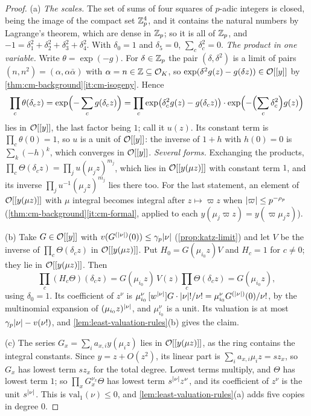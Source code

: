 \begin{proof}
(a) \emph{The scales.} The set of sums of four squares of $p$-adic integers is closed, being the image of the compact set $\mathbb{Z}_p^4$, and it contains the natural numbers by Lagrange's theorem, which are dense in $\mathbb{Z}_p$; so it is all of $\mathbb{Z}_p$, and $-1=\delta_1^2+\delta_2^2+\delta_3^2+\delta_4^2$. With $\delta_0=1$ and $\delta_5=0$, $\sum_c\delta_c^2=0$. \emph{The product in one variable.} Write $\theta=\exp(-g)$. For $\delta\in\mathbb{Z}_p$ the pair $(\delta,\delta^2)$ is a limit of pairs $(n,n^2)=(\alpha,\alpha\bar\alpha)$ with $\alpha=n\in\mathbb{Z}\subseteq\mathcal{O}_K$, so $\exp(\delta^2g(z)-g(\delta z))\in\mathcal{O}[[y]]$ by
\cref{thm:cm-background}\ref{it:cm-isogeny}. Hence
\[
  \prod_c\theta(\delta_cz)=\exp\Bigl(-\sum_cg(\delta_cz)\Bigr)=\prod_c\exp\bigl(\delta_c^2g(z)-g(\delta_cz)\bigr)\cdot\exp\Bigl(-\Bigl(\sum_c\delta_c^2\Bigr)g(z)\Bigr)
\]
lies in $\mathcal{O}[[y]]$, the last factor being $1$; call it $u(z)$. Its constant term is $\prod_c\theta(0)=1$, so $u$ is a unit of $\mathcal{O}[[y]]$: the inverse of $1+h$ with $h(0)=0$ is $\sum_k(-h)^k$, which converges in $\mathcal{O}[[y]]$. \emph{Several forms.} Exchanging the products, $\prod_c\Theta(\delta_cz)=\prod_ju(\mu_jz)^{m_j}$, which lies in $\mathcal{O}[[y(\mu z)]]$ with constant term $1$, and its inverse $\prod_ju^{-1}(\mu_jz)^{m_j}$ lies there too. For the last statement, an element of $\mathcal{O}[[y(\mu z)]]$ with $\mu$ integral becomes integral after $z\mapsto\varpi z$ when $\lvert \varpi\rvert\le p^{-\rho_p}$ (\cref{thm:cm-background}\ref{it:cm-formal}, applied to each $y(\mu_j\varpi z)=y(\varpi\mu_jz)$).

(b) Take $G\in\mathcal{O}[[y]]$ with $v(G^{(\lvert \nu\rvert)}(0))\le\gamma_p\lvert \nu\rvert$ (\cref{prop:katz-limit}) and let $V$ be the inverse of $\prod_c\Theta(\delta_cz)$ in $\mathcal{O}[[y(\mu z)]]$. Put $H_0=G(\mu_{i_0}z)V$ and $H_c=1$ for $c\ne0$; they lie in $\mathcal{O}[[y(\mu z)]]$. Then
\[
  \prod_c(H_c\Theta)(\delta_cz)=G(\mu_{i_0}z)\,V(z)\prod_c\Theta(\delta_cz)=G(\mu_{i_0}z),
\]
using $\delta_0=1$. Its coefficient of $z^\nu$ is $\mu_{i_0}^\nu\,[w^{\lvert \nu\rvert}]G\cdot\lvert \nu\rvert!/\nu!=\mu_{i_0}^\nu G^{(\lvert \nu\rvert)}(0)/\nu!$, by the multinomial expansion of $(\mu_{i_0}z)^{\lvert \nu\rvert}$, and $\mu_{i_0}^\nu$ is a unit. Its valuation is at most $\gamma_p\lvert \nu\rvert-v(\nu!)$, and \cref{lem:least-valuation-rules}(b) gives the claim.

(c) The series $G_x=\sum_ia_{x,i}y(\mu_iz)$ lies in $\mathcal{O}[[y(\mu z)]]$, as the ring contains the integral constants. Since $y=z+O(z^2)$, its linear part is $\sum_ia_{x,i}\mu_iz=sz_x$, so $G_x$ has lowest term $sz_x$ for the total degree. Lowest terms multiply, and $\Theta$ has lowest term $1$; so $\prod_xG_x^{\nu_x}\Theta$ has lowest term $s^{\lvert \nu\rvert}z^\nu$, and its coefficient of $z^\nu$ is the unit $s^{\lvert \nu\rvert}$. This is $\mathrm{val}_1(\nu)\le0$, and \cref{lem:least-valuation-rules}(a) adds five copies in degree $0$.
\end{proof}

